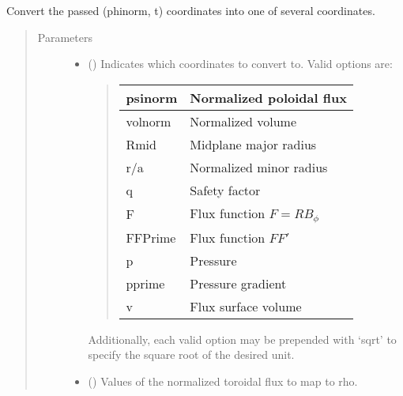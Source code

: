 \documentclass[letterpaper,10pt,english]{sphinxmanual}
\begin{document}
\begin{fulllineitems}
\begin{fulllineitems}
\label{\detokenize{eqtools:eqtools.core.Equilibrium.phinorm2rho}}
Convert the passed (phinorm, t) coordinates into one of several coordinates.
\begin{quote}\begin{description}
\item[{Parameters}] \leavevmode\begin{itemize}
\item {} 
 () \textendash{} 
Indicates which coordinates to convert to.
Valid options are:
\begin{quote}


\begin{savenotes}\sphinxattablestart
\centering
\begin{tabulary}{\linewidth}[t]{|T|T|}
\hline

psinorm
&
Normalized poloidal flux
\\
\hline
volnorm
&
Normalized volume
\\
\hline
Rmid
&
Midplane major radius
\\
\hline
r/a
&
Normalized minor radius
\\
\hline
q
&
Safety factor
\\
\hline
F
&
Flux function \(F=RB_{\phi}\)
\\
\hline
FFPrime
&
Flux function \(FF'\)
\\
\hline
p
&
Pressure
\\
\hline
pprime
&
Pressure gradient
\\
\hline
v
&
Flux surface volume
\\
\hline
\end{tabulary}
\par
\sphinxattableend\end{savenotes}
\end{quote}

Additionally, each valid option may be prepended with ‘sqrt’
to specify the square root of the desired unit.


\item {} 
 () \textendash{} Values of the normalized
toroidal flux to map to rho.


\end{itemize}
\end{description}
\end{quote}
\end{fulllineitems}
\end{fulllineitems}
\end{document}
